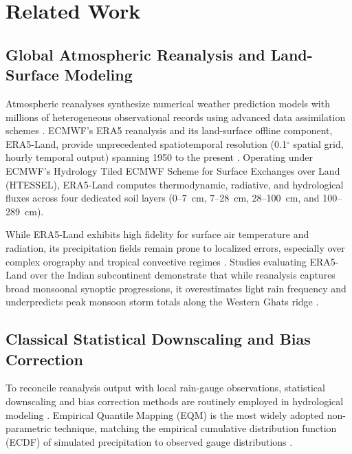 \documentclass[12pt]{article}
\begin{document}
\newpage
\section{Related Work}

\subsection{Global Atmospheric Reanalysis and Land-Surface Modeling}
Atmospheric reanalyses synthesize numerical weather prediction models with millions of heterogeneous observational records using advanced data assimilation schemes \cite{hersbach2020}. ECMWF's ERA5 reanalysis and its land-surface offline component, ERA5-Land, provide unprecedented spatiotemporal resolution (0.1$^\circ$ spatial grid, hourly temporal output) spanning 1950 to the present \cite{munoz2021}. Operating under ECMWF's Hydrology Tiled ECMWF Scheme for Surface Exchanges over Land (HTESSEL), ERA5-Land computes thermodynamic, radiative, and hydrological fluxes across four dedicated soil layers (0--7~cm, 7--28~cm, 28--100~cm, and 100--289~cm). 

While ERA5-Land exhibits high fidelity for surface air temperature and radiation, its precipitation fields remain prone to localized errors, especially over complex orography and tropical convective regimes \cite{goswami2006}. Studies evaluating ERA5-Land over the Indian subcontinent demonstrate that while reanalysis captures broad monsoonal synoptic progressions, it overestimates light rain frequency and underpredicts peak monsoon storm totals along the Western Ghats ridge \cite{pai2014, mohanty2005}.

\subsection{Classical Statistical Downscaling and Bias Correction}
To reconcile reanalysis output with local rain-gauge observations, statistical downscaling and bias correction methods are routinely employed in hydrological modeling \cite{piani2011}. Empirical Quantile Mapping (EQM) is the most widely adopted non-parametric technique, matching the empirical cumulative distribution function (ECDF) of simulated precipitation to observed gauge distributions \cite{cannon2015}. 
\end{document}
